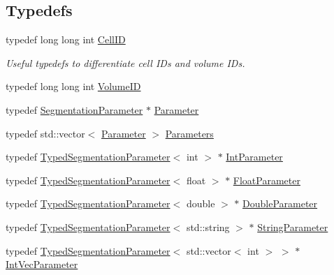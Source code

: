 \subsection*{Typedefs}
\begin{DoxyCompactItemize}
\item 
typedef long long int \hyperlink{namespace_d_d4hep_1_1_d_d_segmentation_ac7af071d85cb48820914434a07e21ba1}{CellID}
\begin{DoxyCompactList}\small\item\em Useful typedefs to differentiate cell IDs and volume IDs. \item\end{DoxyCompactList}\item 
typedef long long int \hyperlink{namespace_d_d4hep_1_1_d_d_segmentation_a61a6833a18d1800bdef176595f83e3ba}{VolumeID}
\item 
typedef \hyperlink{class_d_d4hep_1_1_d_d_segmentation_1_1_segmentation_parameter}{SegmentationParameter} $\ast$ \hyperlink{namespace_d_d4hep_1_1_d_d_segmentation_af6c6bad2a745d807a0ed00506fb34ccf}{Parameter}
\item 
typedef std::vector$<$ \hyperlink{class_d_d4hep_1_1_d_d_segmentation_1_1_segmentation_parameter}{Parameter} $>$ \hyperlink{namespace_d_d4hep_1_1_d_d_segmentation_af38026430ca0e1ef64acdfc898f5dd3d}{Parameters}
\item 
typedef \hyperlink{class_d_d4hep_1_1_d_d_segmentation_1_1_typed_segmentation_parameter}{TypedSegmentationParameter}$<$ int $>$ $\ast$ \hyperlink{namespace_d_d4hep_1_1_d_d_segmentation_a40b9037137fce6e98a4a1b3e74078679}{IntParameter}
\item 
typedef \hyperlink{class_d_d4hep_1_1_d_d_segmentation_1_1_typed_segmentation_parameter}{TypedSegmentationParameter}$<$ float $>$ $\ast$ \hyperlink{namespace_d_d4hep_1_1_d_d_segmentation_a1f6134fdcd18b625bc940d064598090a}{FloatParameter}
\item 
typedef \hyperlink{class_d_d4hep_1_1_d_d_segmentation_1_1_typed_segmentation_parameter}{TypedSegmentationParameter}$<$ double $>$ $\ast$ \hyperlink{namespace_d_d4hep_1_1_d_d_segmentation_a58fbf7ecc413a4ffb59ab7b49d1af947}{DoubleParameter}
\item 
typedef \hyperlink{class_d_d4hep_1_1_d_d_segmentation_1_1_typed_segmentation_parameter}{TypedSegmentationParameter}$<$ std::string $>$ $\ast$ \hyperlink{namespace_d_d4hep_1_1_d_d_segmentation_a43a80cf70a60b3c858aca4fa463d8f7c}{StringParameter}
\item 
typedef \hyperlink{class_d_d4hep_1_1_d_d_segmentation_1_1_typed_segmentation_parameter}{TypedSegmentationParameter}$<$ std::vector$<$ int $>$ $>$ $\ast$ \hyperlink{namespace_d_d4hep_1_1_d_d_segmentation_a999961b3c725feedb2456dd0f046f1e3}{IntVecParameter}

\end{DoxyCompactItemize}
